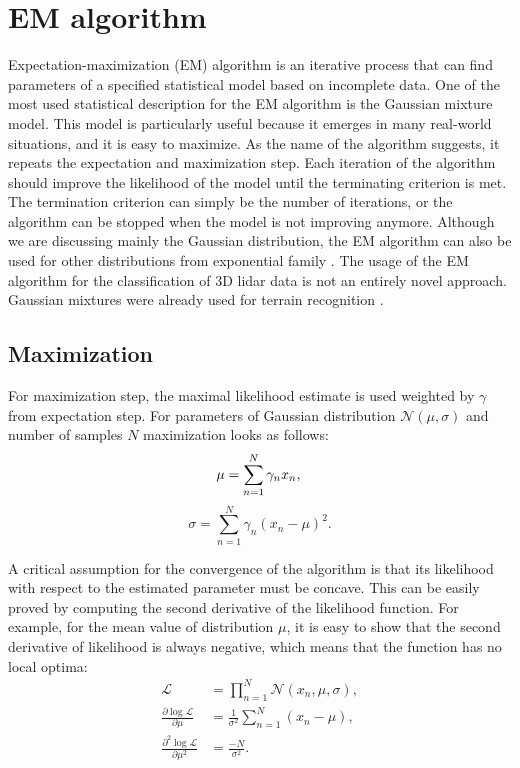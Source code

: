 \section{EM algorithm}
Expectation-maximization (EM) algorithm is an iterative process that can find parameters of a specified statistical model based on incomplete data. One of the most used statistical description for the EM algorithm is the Gaussian mixture model. This model is particularly useful because it emerges in many real-world situations, and it is easy to maximize. As the name of the algorithm suggests, it repeats the expectation and maximization step. Each iteration of the algorithm should improve the likelihood of the model until the terminating criterion is met. The termination criterion can simply be the number of iterations, or the algorithm can be stopped when the model is not improving anymore. Although we are discussing mainly the Gaussian distribution, the EM algorithm can also be used for other distributions from exponential family \cite{dempster1977}. The usage of the EM algorithm for the classification of 3D lidar data is not an entirely novel approach. Gaussian mixtures were already used for terrain recognition \cite{lalonde2006}.
 
\subsection{Maximization}
For maximization step, the maximal likelihood estimate is used weighted by $\gamma$ from expectation step. For parameters of Gaussian distribution $\mathcal{N}(\mu, \sigma)$ and number of samples $N$ maximization looks as follows:
\begin{equation}
\mu = \sum_{n = 1}^{N} \gamma_n x_n, \\
\end{equation}
\begin{equation}
\sigma = \sum_{n = 1}^{N}\gamma_n (x_n - \mu)^2 .
\end{equation}

A critical assumption for the convergence of the algorithm is that its likelihood with respect to the estimated parameter must be concave. This can be easily proved by computing the second derivative of the likelihood function. For example, for the mean value of distribution  $\mu$, it is easy to show that the second derivative of likelihood is always negative, which means that the function has no local optima:
\begin{align}
\mathcal{L} &= \prod_{n=1}^N \mathcal{N}(x_n, \mu, \sigma), \nonumber \\
\frac{\partial \log \mathcal{L}}{\partial \mu} &= \frac{1}{\sigma^2} \sum_{n = 1}^{N} (x_n - \mu), \\
\frac{\partial^2 \log \mathcal{L}}{\partial \mu^2} &= \frac{-N}{\sigma^2}. \nonumber
\end{align}

